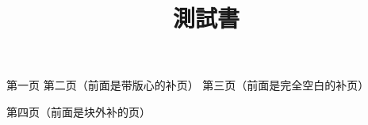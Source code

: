 \documentclass{ltc-guji}
\title{測試書}
\begin{document}
\begin{正文}
第一页
第二页（前面是带版心的补页）
\InsertBlankPage[补页样式=空白]
第三页（前面是完全空白的补页）
\end{正文}
\begin{正文}
第四页（前面是块外补的页）
\end{正文}
\end{document}

